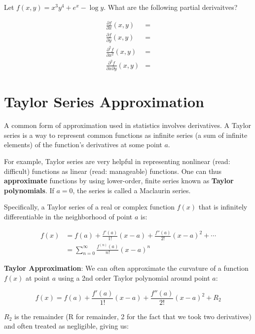 \documentclass[]{book}
\theoremstyle{definition}
\theoremstyle{definition}
\theoremstyle{definition}
\theoremstyle{remark}
\let\BeginKnitrBlock\begin \let\EndKnitrBlock\end
\begin{document}
\BeginKnitrBlock{exercise}
\protect\hypertarget{exr:unnamed-chunk-19}{}{\label{exr:unnamed-chunk-19} }Let \(f(x,y)=x^3 y^4 +e^x -\log y\). What are the following partial derivaitves?

\begin{align*}
\frac{\partial f}{\partial x}(x,y) &=\\
\frac{\partial f}{\partial y}(x,y) &=\\
\frac{\partial^2 f}{\partial x^2}(x,y) &=\\
\frac{\partial^2 f}{\partial x \partial y}(x,y) &= 
\end{align*}
\EndKnitrBlock{exercise}

\hypertarget{taylorapprox}{%
\section{Taylor Series Approximation}\label{taylorapprox}}

A common form of approximation used in statistics involves derivatives. A Taylor series is a way to represent common functions as infinite series (a sum of infinite elements) of the function's derivatives at some point \(a\).

For example, Taylor series are very helpful in representing nonlinear (read: difficult) functions as linear (read: manageable) functions. One can thus \textbf{approximate} functions by using lower-order, finite series known as \textbf{Taylor polynomials}. If \(a=0\), the series is called a Maclaurin series.

Specifically, a Taylor series of a real or complex function \(f(x)\) that is infinitely differentiable in the neighborhood of point \(a\) is:

\begin{align*}
    f(x) &= f(a) + \frac{f'(a)}{1!} (x-a) +  \frac{f''(a)}{2!} (x-a)^2 + \cdots\\
     &= \sum_{n=0}^\infty \frac{f^{(n)} (a)}{n!} (x-a)^n
\end{align*}

\textbf{Taylor Approximation}: We can often approximate the curvature of a function \(f(x)\) at point \(a\) using a 2nd order Taylor polynomial around point \(a\):

\[f(x) = f(a) + \frac{f'(a)}{1!} (x-a) +  \frac{f''(a)}{2!} (x-a)^2
+ R_2\]

\(R_2\) is the remainder (R for remainder, 2 for the fact that we took two derivatives) and often treated as negligible,
giving us:
\end{document}
